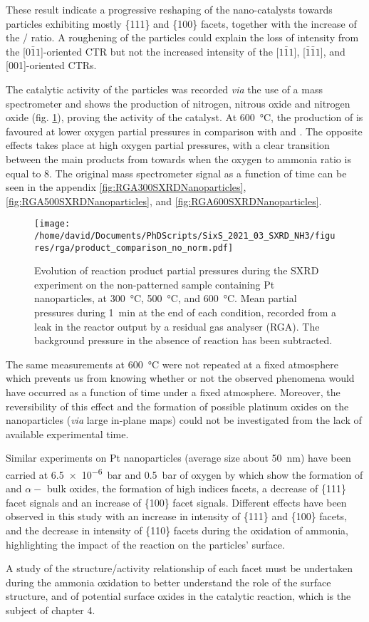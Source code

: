 These result indicate a progressive reshaping of the nano-catalysts towards particles exhibiting mostly \{111\} and \{100\} facets, together with the increase of the / ratio.
A roughening of the particles could explain the loss of intensity from the [$0\bar{1}1$]-oriented CTR but not the increased intensity of the [$1\bar{1}1$], [$\bar{1}\bar{1}1$], and [001]-oriented CTRs.

The catalytic activity of the particles was recorded \textit{via} the use of a mass spectrometer and shows the production of nitrogen, nitrous oxide and nitrogen oxide (fig. \ref{fig:RGASXRDNanoparticlesComparison}), proving the activity of the catalyst.
At \qty{600}{\degreeCelsius}, the production of  is favoured at lower oxygen partial pressures in comparison with  and .
The opposite effects takes place at high oxygen partial pressures, with a clear transition between the main products from  towards  when the oxygen to ammonia ratio is equal to 8.
The original mass spectrometer signal as a function of time can be seen in the appendix \ref{fig:RGA300SXRDNanoparticles}, \ref{fig:RGA500SXRDNanoparticles}, and \ref{fig:RGA600SXRDNanoparticles}.

\begin{figure}[!htb]
    \centering
    \texttt{[image: /home/david/Documents/PhDScripts/SixS\_2021\_03\_SXRD\_NH3/figures/rga/product\_comparison\_no\_norm.pdf]}
    \caption{
        Evolution of reaction product partial pressures during the SXRD experiment on the non-patterned sample containing Pt nanoparticles, at \qty{300}{\degreeCelsius}, \qty{500}{\degreeCelsius}, and \qty{600}{\degreeCelsius}.
        Mean partial pressures during \qty{1}{\minute} at the end of each condition, recorded from a leak in the reactor output by a residual gas analyser (RGA).
        The background pressure in the absence of reaction has been subtracted.
    }
    \label{fig:RGASXRDNanoparticlesComparison}
\end{figure}

The same measurements at \qty{600}{\degreeCelsius} were not repeated at a fixed atmosphere which prevents us from knowing whether or not the observed phenomena would have occurred as a function of time under a fixed atmosphere.
Moreover, the reversibility of this effect and the formation of possible platinum oxides on the nanoparticles (\textit{via} large in-plane maps) could not be investigated from the lack of available experimental time.

Similar experiments on Pt nanoparticles (average size about \qty{50}{\nm}) have been carried at \qty{6.5e-6}{\bar} and \qty{0.5}{\bar} of oxygen by \cite{Hejral2013} which show the formation of  and $\alpha-$ bulk oxides, the formation of high indices facets, a decrease of \{111\} facet signals and an increase of \{100\} facet signals.
Different effects have been observed in this study with an increase in intensity of \{111\} and \{100\} facets, and the decrease in intensity of \{110\} facets during the oxidation of ammonia, highlighting the impact of the reaction on the particles' surface.

A study of the structure/activity relationship of each facet must be undertaken during the ammonia oxidation to better understand the role of the surface structure, and of potential surface oxides in the catalytic reaction, which is the subject of chapter 4.